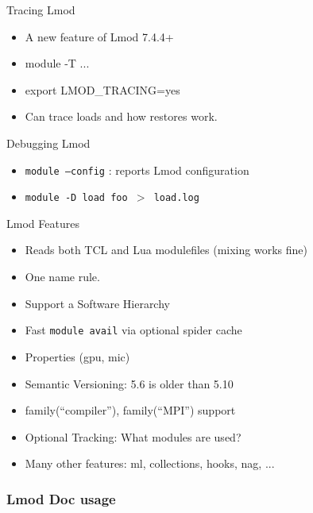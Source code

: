 \documentclass{beamer}
\begin{document}
\begin{frame}{Tracing Lmod}
  \begin{itemize}
    \item A new feature of Lmod 7.4.4+
    \item module -T ...
    \item export LMOD\_TRACING=yes
    \item Can trace loads and how restores work.
  \end{itemize}
\end{frame}

\begin{frame}{Debugging Lmod}
  \begin{itemize}
    \item \texttt{module --config} : reports Lmod configuration
    \item \texttt{module -D load foo $>$ load.log}
  \end{itemize}
\end{frame}

\begin{frame}{Lmod Features}
  \begin{itemize}
    \item Reads both TCL and Lua modulefiles (mixing works fine)
    \item One name rule.
    \item Support a Software Hierarchy
    \item Fast \texttt{module avail} via optional spider cache 
    \item Properties (gpu, mic)
    \item Semantic Versioning:  5.6 is older than 5.10
    \item family(``compiler''), family(``MPI'') support
    \item Optional Tracking: What modules are used?
    \item Many other features: ml, collections, hooks, nag, ...
  \end{itemize}
\end{frame}


\begin{frame}[fragile]
    \frametitle{Lmod Doc usage}
\end{frame}
\end{document}
